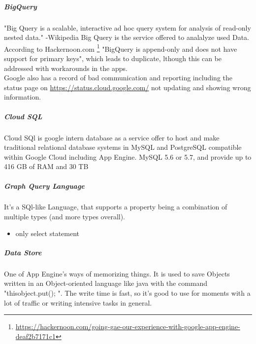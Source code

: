 \documentclass{article}
\begin{document}
 \subparagraph{BigQuery}
 "Big Query is a scalable, interactive ad hoc query system for analysis of read-only nested data." -Wikipedia 
 Big Query is the service offered to analalyze used Data. According to Hackernoon.com \footnote{\url{https://hackernoon.com/going-gae-our-experience-with-google-app-engine-deaf2b7171c1}} "BigQuery is append-only and does not have support for primary keys", which leads to duplicate, lthough this can be addressed with workarounds in the apps. \\
 Google also has a record of bad communication and reporting including the status page on \url{https://status.cloud.google.com/} not updating and showing wrong information. 
 \subparagraph{Cloud SQL}
 Cloud SQl is google intern database as a service offer to host and make traditional relational database systems in MySQL and PostgreSQL compatible within Google Cloud including App Engine.  MySQL 5.6 or 5.7, and provide up to 416 GB of RAM and 30 TB
 \subparagraph{Graph Query Language}
 
 It's a SQl-like Language, that supports a property being a combination of multiple types (and more types overall).
 \begin{itemize}
 	\item only select statement
 \end{itemize}
 \subparagraph{Data Store}
 One of App Engine's ways of memorizing things. It is used to save Objects written in an Object-oriented language like java with the command "thisobject.put(); ". The write time is fast, so it's good to use for moments with a lot of traffic or writing intensive tasks in general.
\end{document}
